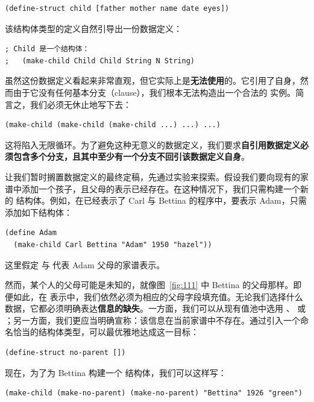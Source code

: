 \begin{lstlisting}[language=BSL]
(define-struct child [father mother name date eyes])
\end{lstlisting}

该结构体类型的定义自然引导出一份数据定义：

\begin{lstlisting}[language=BSL]
; Child 是一个结构体：
;   (make-child Child Child String N String)
\end{lstlisting}

虽然这份数据定义看起来非常直观，但它实际上是\textbf{无法使用}的。它引用了自身，然而由于它没有任何基本分支（clause），我们根本无法构造出一个合法的  实例。简言之，我们必须无休止地写下去：

\begin{lstlisting}[language=BSL]
(make-child (make-child (make-child ...) ...) ...)
\end{lstlisting}

这将陷入无限循环。为了避免这种无意义的数据定义，我们要求\textbf{自引用数据定义必须包含多个分支，且其中至少有一个分支不回引该数据定义自身}。

让我们暂时搁置数据定义的最终定稿，先通过实验来探索。假设我们要向现有的家谱中添加一个孩子，且父母的表示已经存在。在这种情况下，我们只需构建一个新的  结构体。例如，在已经表示了 Carl 与 Bettina 的程序中，要表示 Adam，只需添加如下结构体：

\begin{lstlisting}[language=BSL]
(define Adam
  (make-child Carl Bettina "Adam" 1950 "hazel"))
\end{lstlisting}

这里假定  与  代表 Adam 父母的家谱表示。

然而，某个人的父母可能是未知的，就像图~\ref{fig:111} 中 Bettina 的父母那样。即便如此，在  表示中，我们依然必须为相应的父母字段填充值。无论我们选择什么数据，它都必须明确表达\textbf{信息的缺失}。一方面，我们可以从现有值池中选用 、 或 ；另一方面，我们更应当明确宣称：该信息在当前家谱中不存在。通过引入一个命名恰当的结构体类型，可以最优雅地达成这一目标：

\begin{lstlisting}[language=BSL]
(define-struct no-parent [])
\end{lstlisting}

现在，为了为 Bettina 构建一个  结构体，我们可以这样写：

\begin{lstlisting}[language=BSL]
(make-child (make-no-parent) (make-no-parent) "Bettina" 1926 "green")
\end{lstlisting}

